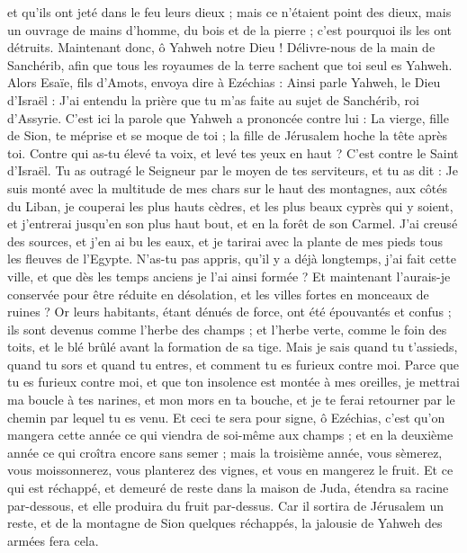 \begin{multicols}{2}
et qu'ils ont jeté dans le feu leurs dieux ; mais ce n'étaient point des dieux, mais un ouvrage de mains d'homme, du bois et de la pierre ; c'est pourquoi ils les ont détruits.
Maintenant donc, ô Yahweh notre Dieu ! Délivre-nous de la main de Sanchérib, afin que tous les royaumes de la terre sachent que toi seul es Yahweh.
Alors Esaïe, fils d'Amots, envoya dire à Ezéchias : Ainsi parle Yahweh, le Dieu d'Israël : J'ai entendu la prière que tu m'as faite au sujet de Sanchérib, roi d'Assyrie.
C'est ici la parole que Yahweh a prononcée contre lui : La vierge, fille de Sion, te méprise et se moque de toi ; la fille de Jérusalem hoche la tête après toi.
Contre qui as-tu élevé ta voix, et levé tes yeux en haut ? C'est contre le Saint d'Israël.
Tu as outragé le Seigneur par le moyen de tes serviteurs, et tu as dit : Je suis monté avec la multitude de mes chars sur le haut des montagnes, aux côtés du Liban, je couperai les plus hauts cèdres, et les plus beaux cyprès qui y soient, et j'entrerai jusqu'en son plus haut bout, et en la forêt de son Carmel.
J'ai creusé des sources, et j'en ai bu les eaux, et je tarirai avec la plante de mes pieds tous les fleuves de l'Egypte.
N'as-tu pas appris, qu'il y a déjà longtemps, j'ai fait cette ville, et que dès les temps anciens je l'ai ainsi formée ? Et maintenant l'aurais-je conservée pour être réduite en désolation, et les villes fortes en monceaux de ruines ?
Or leurs habitants, étant dénués de force, ont été épouvantés et confus ; ils sont devenus comme l'herbe des champs ; et l'herbe verte, comme le foin des toits, et le blé brûlé avant la formation de sa tige.
Mais je sais quand tu t'assieds, quand tu sors et quand tu entres, et comment tu es furieux contre moi.
Parce que tu es furieux contre moi, et que ton insolence est montée à mes oreilles, je mettrai ma boucle à tes narines, et mon mors en ta bouche, et je te ferai retourner par le chemin par lequel tu es venu.
Et ceci te sera pour signe, ô Ezéchias, c'est qu'on mangera cette année ce qui viendra de soi-même aux champs ; et en la deuxième année ce qui croîtra encore sans semer ; mais la troisième année, vous sèmerez, vous moissonnerez, vous planterez des vignes, et vous en mangerez le fruit.
Et ce qui est réchappé, et demeuré de reste dans la maison de Juda, étendra sa racine par-dessous, et elle produira du fruit par-dessus.
Car il sortira de Jérusalem un reste, et de la montagne de Sion quelques réchappés, la jalousie de Yahweh des armées fera cela.

\end{multicols}
